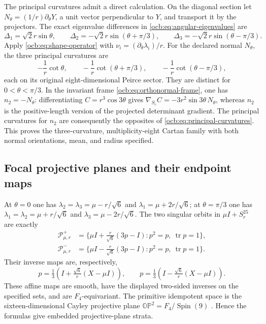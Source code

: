 \documentclass[11pt]{article}
\theoremstyle{definition}
\begin{document}
The principal curvatures admit a direct calculation. On the diagonal
section let $N_\theta=(1/r)\partial_\theta Y$, a unit vector
perpendicular to $Y$, and transport it by the projectors. The exact
eigenvalue differences in \eqref{ocb:eq:angular-eigenvalues} are
\begin{equation}
 \Delta_1=\sqrt2r\sin\theta,\qquad
 \Delta_2=-\sqrt2r\sin(\theta+\pi/3),\qquad
 \Delta_3=-\sqrt2r\sin(\theta-\pi/3).
 \label{ocb:eq:angular-differences}\tag{OCB31}
\end{equation}
Apply \eqref{ocb:eq:shape-operator} with
$\nu_i=(\partial_\theta\lambda_i)/r$. For the declared normal
$N_\theta$, the three principal curvatures are
\begin{equation}
 -\frac1r\cot\theta,\qquad
 -\frac1r\cot(\theta+\pi/3),\qquad
 -\frac1r\cot(\theta-\pi/3),
 \label{ocb:eq:principal-curvatures}\tag{OCB32}
\end{equation}
each on its original eight-dimensional Peirce sector. They are
distinct for $0<\theta<\pi/3$. In the invariant frame
\eqref{ocb:eq:orthonormal-frame}, one has $n_2=-N_\theta$:
differentiating $C=r^3\cos3\theta$ gives
$\nabla_{S_r}C=-3r^2\sin3\theta\,N_\theta$, whereas $n_2$
is the positive-length version of the projected determinant
gradient. The principal curvatures for $n_2$ are consequently the
opposites of \eqref{ocb:eq:principal-curvatures}. This proves the
three-curvature, multiplicity-eight Cartan family with both normal
orientations, mean, and radius specified.

\subsection{Focal projective planes and their endpoint maps}
\label{ocb:sec:focal-strata}

At $\theta=0$ one has
$\lambda_2=\lambda_3=\mu-r/\sqrt6$ and
$\lambda_1=\mu+2r/\sqrt6$; at $\theta=\pi/3$ one has
$\lambda_1=\lambda_2=\mu+r/\sqrt6$ and
$\lambda_3=\mu-2r/\sqrt6$. The two singular orbits in
$\mu I+S_r^{25}$ are exactly
\begin{equation}
 \begin{aligned}
 \mathcal P^+_{\mu,r}
 &=\{\mu I+\tfrac r{\sqrt6}(3p-I):p^2=p,\
                                       \operatorname{tr}p=1\},\\
 \mathcal P^-_{\mu,r}
 &=\{\mu I-\tfrac r{\sqrt6}(3p-I):p^2=p,\
                                       \operatorname{tr}p=1\}.
 \end{aligned}
 \label{ocb:eq:focal-planes}\tag{OCB33}
\end{equation}
Their inverse maps are, respectively,
\begin{equation}
 p=\tfrac13\left(I+\tfrac{\sqrt6}{r}(X-\mu I)\right),\qquad
 p=\tfrac13\left(I-\tfrac{\sqrt6}{r}(X-\mu I)\right).
 \label{ocb:eq:focal-inverses}\tag{OCB34}
\end{equation}
These affine maps are smooth, have the displayed two-sided inverses
on the specified sets, and are $F_4$-equivariant. The primitive
idempotent space is the sixteen-dimensional Cayley projective plane
$\mathbb O\mathbb P^2=F_4/\operatorname{Spin}(9)$
\cite[Theorems~2.7.4 and 2.8.3]{Yokota2009}
\cite[Section~2.3]{MareWillems2013}. Hence the formulas give embedded
projective-plane strata.
\end{document}
